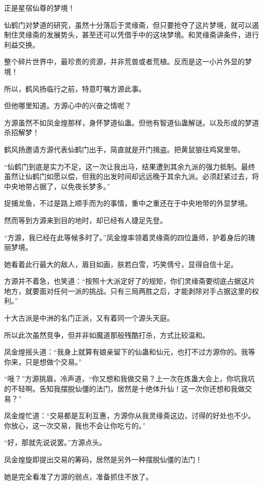 \begin{this_body}
正是星宿仙尊的梦境！

仙鹤门对梦道的研究，虽然十分落后于灵缘斋，但只要抢夺了这片梦境，就可以遏制住灵缘斋的发展势头，甚至还可以凭借手中的这块梦境。和灵缘斋讲条件，进行利益交换。

整个碎片世界中，最珍贵的资源，并非荒兽或者荒植。反而是这一小片外显的梦境！

所以，鹤风扬临行之前，特意叮嘱方源此事。

但他哪里知道。方源心中的兴奋之情呢？

方源虽然不如凤金煌那样，身怀梦道仙蛊。但他有智道仙蛊解谜。以及形成的梦道杀招解梦！

鹤风扬邀请方源代表仙鹤门出手，简直就是开门揖盗。把黄鼠狼往鸡窝里带。

“仙鹤门到底是实力不足，这一次让我出马，结果遭到其余九派的强力抵制。最终虽然让仙鹤门如愿以偿，但我的出发时间却远远晚于其余九派。必须赶紧过去，将中央地带占据了，以免夜长梦多。”

捉捕龙鱼，不过是路上顺手而为的事情，重中之重还在于中央地带的外显梦境。

然而等到方源来到目的地时，却已经有人捷足先登。

“方源，我已经在此等候多时了。”凤金煌率领着灵缘斋的四位蛊师，护着身后的瑰丽梦境。

她看着此行最大的敌人，眉目如画，肤若白雪，巧笑倩兮，显得自信十足。

方源并不着急，也笑道：“按照十大派定好了的规矩，你们灵缘斋要彻底占据这片地方，就要面对任何一派的挑战。只有三局两胜之后，才能剥除对手占据这里的权利。”

十大古派是中洲的名门正派，又有着同一个源头天庭。

所以此次虽然竞争，但并非如魔道那般残酷打杀，方式比较温和。

凤金煌摇头道：“我身上就算有娘亲留下的仙蛊和仙元，也打不过方源你的。我等你来，只是想做个交易。”

“哦？”方源挑眉，冷声道，“你又想和我做交易？上一次在炼蛊大会上，你坑我坑的不轻啊。告知我摆脱仙僵的法门，居然是十绝体升仙！这一次你还想和我做交易？”

凤金煌忙道：“交易都是互利互惠，方源你从我灵缘斋这边，讨得的好处也不少。你放心，这一次交易，我也不会让你吃亏的。”

“好，那就先说说罢。”方源点头。

凤金煌旋即提出交易的筹码，居然是另外一种摆脱仙僵的法门！

她是完全看准了方源的弱点，准备抓住不放了。


\end{this_body}
